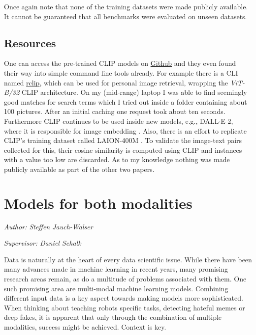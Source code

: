 \documentclass[
]{krantz}
\begin{document}
Once again note that none of the training datasets were made publicly available.
It cannot be guaranteed that all benchmarks were evaluated on unseen datasets.

\hypertarget{resources}{%
\subsection{Resources}\label{resources}}

One can access the pre-trained CLIP models on \href{https://github.com/openai/CLIP}{Github} and they even found their way into simple command line tools already.
For example there is a CLI named \href{https://github.com/yurijmikhalevich/rclip}{rclip}, which can be used for personal image retrieval, wrapping the \emph{ViT-B/32} CLIP architecture.
On my (mid-range) laptop I was able to find seemingly good matches for search terms which I tried out inside a folder containing about 100 pictures.
After an initial caching one request took about ten seconds.
Furthermore CLIP continues to be used inside new models, e.g., DALL\(\cdot\)E 2, where it is responsible for image embedding \citep{ramesh2022hierarchical}.
Also, there is an effort to replicate CLIP's training dataset called LAION-400M \citep{schuhmann2022laion}.
To validate the image-text pairs collected for this, their cosine similarity is computed using CLIP and instances with a value too low are discarded.
As to my knowledge nothing was made publicly available as part of the other two papers.

\hypertarget{c02-05-text-plus-img}{%
\section{Models for both modalities}\label{c02-05-text-plus-img}}

\emph{Author: Steffen Jauch-Walser }

\emph{Supervisor: Daniel Schalk}

Data is naturally at the heart of every data scientific issue. While there have been many advances made in machine learning in recent years, many promising research areas remain, as do a multitude of problems associated with them. One such promising area are multi-modal machine learning models.
Combining different input data is a key aspect towards making models more sophisticated. When thinking about teaching robots specific tasks, detecting hateful memes or deep fakes, it is apparent that only through the combination of multiple modalities, success might be achieved. Context is key.
\end{document}
